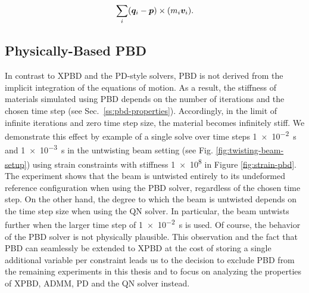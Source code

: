 \begin{equation}\label{eq:angular_momentum}
    \sum_i (\bm{q}_i - \bm{p}) \times (m_i \bm{v}_i).
\end{equation}

\subsection{Physically-Based PBD}\label{ss:physical-pbd}
In contrast to XPBD and the PD-style solvers, PBD is not derived from the implicit integration of the equations of motion. As a result, the stiffness of materials 
simulated using PBD depends on the number of iterations and the chosen time step (see Sec.\ \ref{ss:pbd-properties}). Accordingly, in the limit of infinite iterations and zero 
time step size, the material becomes infinitely stiff. We demonstrate this effect by example of a single solve over time steps \SI{1e-2}{\second} and \SI{1e-3}{\second} in the 
untwisting beam setting (see Fig. \ref{fig:twisting-beam-setup}) using strain constraints with stiffness \num{1e8} in Figure \ref{fig:strain-pbd}. The experiment shows that the 
beam is untwisted entirely to its undeformed reference configuration when using the PBD solver, regardless of the chosen time step. On the other hand, the degree to which the 
beam is untwisted depends on the time step size when using the QN solver. In particular, the beam untwists further when the larger time step of \SI{1e-2}{\second} 
is used. Of course, the behavior of the PBD solver is not physically plausible. This observation and the fact that PBD can seamlessly be extended to XPBD at the cost of storing 
a single additional variable per constraint leads us to the decision to exclude PBD from the remaining experiments in this thesis and to focus on analyzing the properties of 
XPBD, ADMM, PD and the QN solver instead.

